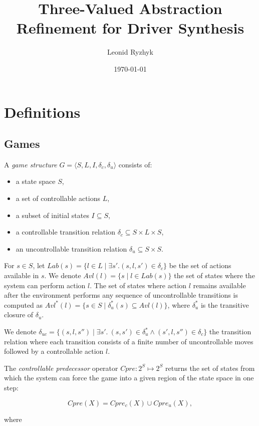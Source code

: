 \documentclass[a4paper,11pt]{article}
\title{Three-Valued Abstraction Refinement for Driver Synthesis}
\author{Leonid Ryzhyk}
\date{\today}
\begin{document}
\maketitle

\section{Definitions}

\subsection{Games}

A \emph{game structure} $G=\langle S, L, I, \delta_c, \delta_u 
\rangle$ consists of:

\begin{itemize}
    \item a state space $S$,
    \item a set of controllable actions $L$,
    \item a subset of initial states $I \subseteq S$,
    \item a controllable transition relation $\delta_c \subseteq S 
        \times L \times S$,
    \item an uncontrollable transition relation $\delta_u 
        \subseteq S \times S$.
\end{itemize}

For $s\in S$, let $Lab(s) = \{l\in L \mid \exists s' . (s,l,s') 
\in \delta_c\}$ be the set of actions available in $s$.  We denote 
$Avl(l)=\{s \mid l \in Lab(s)\}$ the set of states where the 
system can perform action $l$.  The set of states where action $l$ 
remains available after the environment performs any sequence of 
uncontrollable transitions is computed as $Avl^*(l)=\{s\in S \mid 
\delta_u^*(s) \subseteq Avl(l)\}$, where $\delta_u^*$ is the 
transitive closure of $\delta_u$.

We denote $\delta_{uc} = \{(s,l,s'') \mid \exists s' 
.~(s,s')\in\delta_u^*\wedge(s',l,s'')\in\delta_c\}$ the transition 
relation where each transition consists of a finite number of 
uncontrollable moves followed by a controllable action $l$.

The \emph{controllable predecessor} operator $Cpre: 2^S \mapsto 
2^S$ returns the set of states from which the system can force the 
game into a given region of the state space in one step:

$$Cpre(X)=Cpre_c(X) \cup Cpre_u(X),$$ 

where
\end{document}
